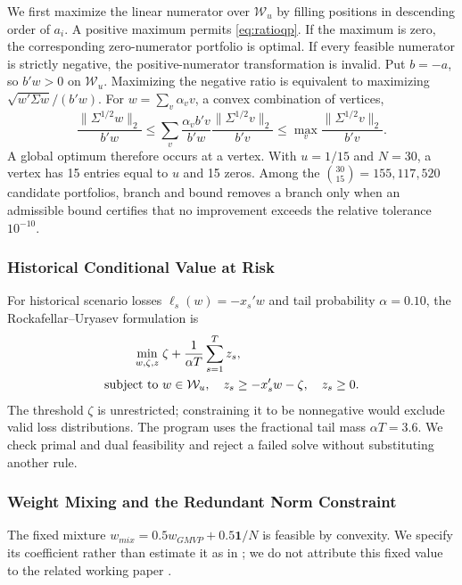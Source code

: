 \documentclass[letterpaper,journal]{IEEEtran}
\begin{document}
We first maximize the linear numerator over $\mathcal W_u$ by filling positions in descending order of $a_i$. A positive maximum permits \eqref{eq:ratioqp}. If the maximum is zero, the corresponding zero-numerator portfolio is optimal. If every feasible numerator is strictly negative, the positive-numerator transformation is invalid. Put $b=-a$, so $b'w>0$ on $\mathcal W_u$. Maximizing the negative ratio is equivalent to maximizing $\sqrt{w'\Sigma w}/(b'w)$. For $w=\sum_v\alpha_vv$, a convex combination of vertices,
\begin{equation}
 \frac{\|\Sigma^{1/2}w\|_2}{b'w}
 \leq\sum_v\frac{\alpha_vb'v}{b'w}
 \frac{\|\Sigma^{1/2}v\|_2}{b'v}
 \leq\max_v\frac{\|\Sigma^{1/2}v\|_2}{b'v}.
\end{equation}
A global optimum therefore occurs at a vertex. With $u=1/15$ and $N=30$, a vertex has 15 entries equal to $u$ and 15 zeros. Among the $\binom{30}{15}=155{,}117{,}520$ candidate portfolios, branch and bound removes a branch only when an admissible bound certifies that no improvement exceeds the relative tolerance $10^{-10}$.

\subsubsection{Historical Conditional Value at Risk}
For historical scenario losses $\ell_s(w)=-x_s'w$ and tail probability $\alpha=0.10$, the Rockafellar--Uryasev formulation \cite{cvar} is
\begin{align}\label{eq:cvar}
 \min_{w,\zeta,z}\;&\zeta+\frac{1}{\alpha T}\sum_{s=1}^T z_s,\notag\\
 \text{subject to }&w\in\mathcal W_u,\quad z_s\geq-x_s'w-\zeta,\quad z_s\geq0.
\end{align}
The threshold $\zeta$ is unrestricted; constraining it to be nonnegative would exclude valid loss distributions. The program uses the fractional tail mass $\alpha T=3.6$. We check primal and dual feasibility and reject a failed solve without substituting another rule.

\subsubsection{Weight Mixing and the Redundant Norm Constraint}
The fixed mixture $w_{mix}=0.5w_{GMVP}+0.5\mathbf1/N$ is feasible by convexity. We specify its coefficient rather than estimate it as in \cite{tuzhou}; we do not attribute this fixed value to the related working paper \cite{kanwangzhou}.
\end{document}

